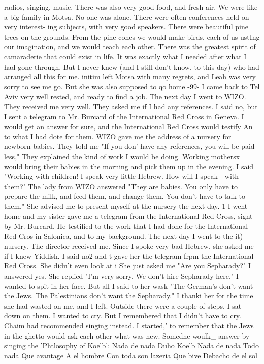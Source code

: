 {radios, singing, music.
There was also very good food, and fresh air.
We were like a big 
family in Motsa.
No-one was alone.
There were often conferences held on very interest-
ing subjects, with very good speakers.
There were beautiful pine trees on the grounds.
From the pine cones we would make birds, each of us ustIng our imagination, and we would 
teach each other.
There was the greatest spirit of camaraderie that could exist in life.
It was exactly what I needed after what I had gone through.
But I never knew (and I still 
don't know, to this day) who had arranged all this for me.
initim left Motsa with many regrets, and Leah was very sorry to see me go.
But she 
was also supposed to qo home 
-99- 
I came back to Tel Aviv very well rested, and ready to find a job.
The next day I 
went to WIZO.
They received me very well.
They asked me if I had any references.
I 
said no, but I sent a telegram to Mr.
Burcard of the International Red Cross in Geneva.
I would get an answer for sure, and the International Red Cross would testify An to what 
I had dote for them.
WIZO gave me the address of a nursery for newborn babies.
They told me "If you don' 
have any references, you will be paid less," They explained the kind of work I would be 
doing.
Working mothersx would bring their babies in the morning and pick them up in the 
evening.
I said "Working with children!
I speak very little Hebrew.
How will I speak - 
with them?"
The lady from WIZO answered "They are babies.
You only have to prepare the 
milk, and feed them, and change them.
You don't have to talk to them."
She advised me 
to present myself at the nursery the next day.
1 
I went home and my sister gave me a telegram from the International Red Cross, signt 
by Mr.
Burcard.
He testified to the work that I had done for the International Red Cros 
in Salonica, and to my background.
The next day I went to the it) nursery.
The director 
received me.
Since I spoke very bad Hebrew, she asked me if I knew Yiddish.
I said no2 
and t gave her the telegram frpm the International Red Cross.
She didn't even look at i 
She just asked me "Are you Sepharady?"
I answered yes.
She replied "I'm very sorry.
We don't hire Sepharady here."
I wanted to spit in her face.
But all I said to her wask 
"The German's don't want the Jews.
The Palestinians don't want the Sepharady."
I thanki 
her for the time she had wasted on me, and I left.
Outside there were a couple of steps.
I sat down on them.
I wanted to cry.
But I 
remembered that I didn't have to cry.
Chaim had recommended singing instead.
I started,' 
to remember that the Jews in the ghetto would ask each other what was new.
Somedne woulk_ 
answer by singing the 'Phtlosophy of Koelb': 
Nada de nada 
Duho Koelb 
Nada de nada 
Todo nada 
Que avantage 
A el hombre 
Con toda son lazeria 
Que bive 
Debacho de el sol 



}
